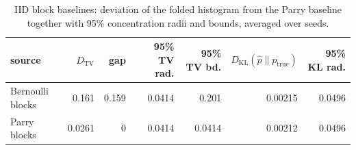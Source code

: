\begin{table}[H]
\centering
\scriptsize
\setlength{\tabcolsep}{4pt}
\caption{IID block baselines: deviation of the folded histogram from the Parry
baseline together with 95\% concentration radii and bounds, averaged over
seeds.}
\label{tab:iid_sources_fold_vs_parry_ci}
\begin{tabular}{lrrrrrr}
\toprule
source & $D_\mathrm{TV}$ & gap & 95\% TV rad. & 95\% TV bd. & $D_\mathrm{KL}(\hat p\|p_{\mathrm{true}})$ & 95\% KL rad.\\
\midrule
Bernoulli blocks & 0.161 & 0.159 & 0.0414 & 0.201 & 0.00215 & 0.0496\\
Parry blocks & 0.0261 & 0 & 0.0414 & 0.0414 & 0.00212 & 0.0496\\
\bottomrule
\end{tabular}
\end{table}
